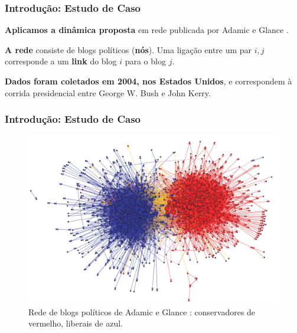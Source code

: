 \begin{frame}
  \frametitle{Introdução: Estudo de Caso}

  \begin{alertblock}{}
    \vspace{5mm}

    \textbf{\alert{Aplicamos a dinâmica proposta}} em rede publicada por Adamic e Glance
      \cite{Adamic:2005:PoliticalBlogs}.
    \vspace{5mm}

    \textbf{\alert{A rede}} consiste de blogs políticos (\textbf{nós}). Uma
      ligação entre um par $i, j$ corresponde a um \textbf{link} do blog $i$ para
      o blog $j$.
    \vspace{5mm}

    \textbf{\alert{Dados foram coletados em 2004, nos Estados Unidos}}, e
      correspondem à corrida presidencial entre George W. Bush e John Kerry.
    \vspace{5mm}

  \end{alertblock}
\end{frame}

\begin{frame}
  \frametitle{Introdução: Estudo de Caso}

  \begin{figure}
    \centering
    \includegraphics[scale=0.2125]{./figures/AdamicGlanceNetwork}
    \caption*{Rede de blogs políticos de Adamic e Glance
      \cite{Adamic:2005:PoliticalBlogs}: conservadores de vermelho, liberais de
      azul.}
  \end{figure}
\end{frame}

